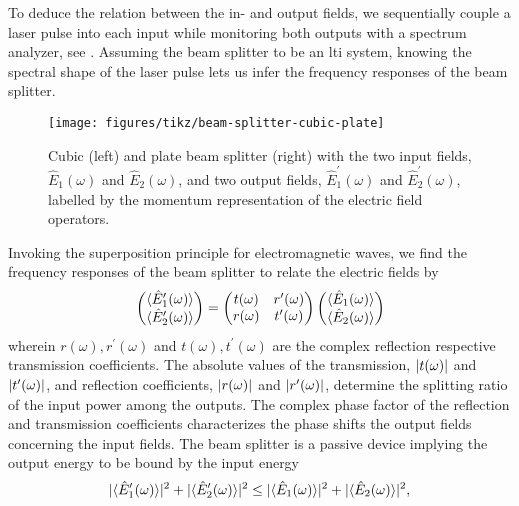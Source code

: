 To deduce the relation between the in- and output fields, we sequentially couple a laser pulse into each input while monitoring both outputs with a spectrum analyzer, see .
Assuming the beam splitter to be an \gls{lti} system, knowing the spectral shape of the laser pulse lets us infer the frequency responses of the beam splitter.
\begin{figure}[htb]
    \centering
    \texttt{[image: figures/tikz/beam-splitter-cubic-plate]}
    \caption{Cubic (left) and plate beam splitter (right) with the two input fields, $\hat{E}_1(\omega)$ and $\hat{E}_2(\omega)$, and two output fields, $\hat{E}_1^\prime(\omega)$ and $\hat{E}_2^\prime(\omega)$, labelled by the momentum representation of the electric field operators.}\label{fig:beam_splitter_inputs_outputs}
\end{figure}
Invoking the superposition principle for electromagnetic waves, we find the frequency responses of the beam splitter to relate the electric fields by
\begin{equation}
    \begin{pmatrix}
        \langle\hat{E}_1^\prime(\omega)\rangle \\
        \langle\hat{E}_2^\prime(\omega)\rangle
    \end{pmatrix}
    =
    \begin{pmatrix}
        t(\omega) & r^\prime(\omega)
        \\
        r(\omega) & t^\prime(\omega)
    \end{pmatrix}
    \begin{pmatrix}
		\langle\hat{E}_1(\omega)\rangle \\
        \langle\hat{E}_2(\omega)\rangle
    \end{pmatrix}
    \label{eq:beam_splitter_expval}
\end{equation}
wherein $r(\omega),r^\prime(\omega)$ and $t(\omega),t^\prime(\omega)$ are the complex reflection respective transmission coefficients.
The absolute values of the transmission, $\lvert t(\omega)\rvert$ and $\lvert t^\prime(\omega)\rvert$, and reflection coefficients, $\lvert r(\omega)\rvert$ and $\lvert r^\prime(\omega)\rvert$, determine the splitting ratio of the input power among the outputs.
The complex phase factor of the reflection and transmission coefficients characterizes the phase shifts the output fields concerning the input fields.
The beam splitter is a passive device implying the output energy to be bound by the input energy
\begin{equation}
    \lvert\langle\hat{E}_1^\prime(\omega)\rangle\rvert^2
    +
    \lvert\langle\hat{E}_2^\prime(\omega)\rangle\rvert^2
    \leq
    \lvert\langle\hat{E}_1(\omega)\rangle\rvert^2
    +
    \lvert\langle\hat{E}_2(\omega)\rangle\rvert^2
    \label{eq:beam_splitter_passive}
    ,
\end{equation}
